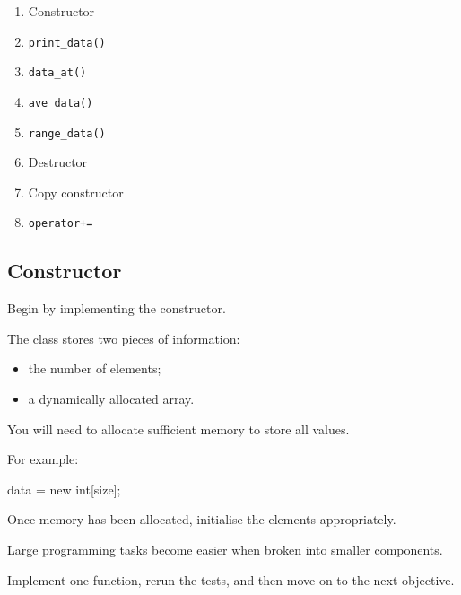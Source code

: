 \documentclass{csc2059practical}
\begin{document}
\begin{enumerate}

\item Constructor

\item \texttt{print\_data()}

\item \texttt{data\_at()}

\item \texttt{ave\_data()}

\item \texttt{range\_data()}

\item Destructor

\item Copy constructor

\item \texttt{operator+=}

\end{enumerate}

\subsection*{Constructor}

Begin by implementing the constructor.

The class stores two pieces of information:

\begin{itemize}

\item the number of elements;

\item a dynamically allocated array.

\end{itemize}

You will need to allocate sufficient memory to store all values.

For example:

\begin{cppcode}
data = new int[size];
\end{cppcode}

Once memory has been allocated, initialise the elements appropriately.

\begin{tipbox}

Large programming tasks become easier when broken into smaller
components.

Implement one function, rerun the tests, and then move on to the next
objective.

\end{tipbox}
\end{document}
